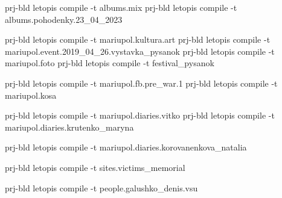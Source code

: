  
 
 
 
 


prj-bld letopis compile -t albums.mix
prj-bld letopis compile -t albums.pohodenky.23_04_2023

prj-bld letopis compile -t mariupol.kultura.art
prj-bld letopis compile -t mariupol.event.2019_04_26.vystavka_pysanok
prj-bld letopis compile -t mariupol.foto
prj-bld letopis compile -t festival_pysanok

prj-bld letopis compile -t mariupol.fb.pre_war.1
prj-bld letopis compile -t mariupol.kosa

prj-bld letopis compile -t mariupol.diaries.vitko
prj-bld letopis compile -t mariupol.diaries.krutenko_maryna

prj-bld letopis compile -t mariupol.diaries.korovanenkova_natalia

prj-bld letopis compile -t sites.victims_memorial

prj-bld letopis compile -t people.galushko_denis.vsu

